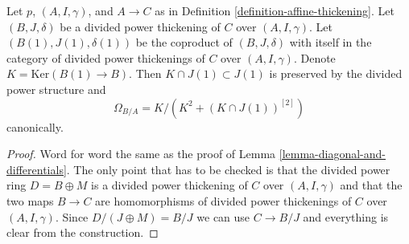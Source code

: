 \begin{lemma}
\label{lemma-diagonal-and-differentials-affine-site}
Let $p$, $(A, I, \gamma)$, and $A \to C$ as in
Definition \ref{definition-affine-thickening}.
Let $(B, J, \delta)$ be a divided power thickening of $C$ over
$(A, I, \gamma)$. Let $(B(1), J(1), \delta(1))$ be the coproduct
of $(B, J, \delta)$ with itself in the category of divided power
thickenings of $C$ over $(A, I, \gamma)$. Denote
$K = \text{Ker}(B(1) \to B)$. Then $K \cap J(1) \subset J(1)$
is preserved by the divided power structure and
$$
\Omega_{B/A} = K/ \left(K^2 + (K \cap J(1))^{[2]}\right)
$$
canonically.
\end{lemma}

\begin{proof}
Word for word the same as the proof of
Lemma \ref{lemma-diagonal-and-differentials}.
The only point that has to be checked is that the
divided power ring $D = B \oplus M$ is a
divided power thickening of $C$ over $(A, I, \gamma)$
and that the two maps $B \to C$ are homomorphisms of
divided power thickenings of $C$ over $(A, I, \gamma)$.
Since $D/(J \oplus M) = B/J$ we can use $C \to B/J$
and everything is clear from the construction.
\end{proof}

